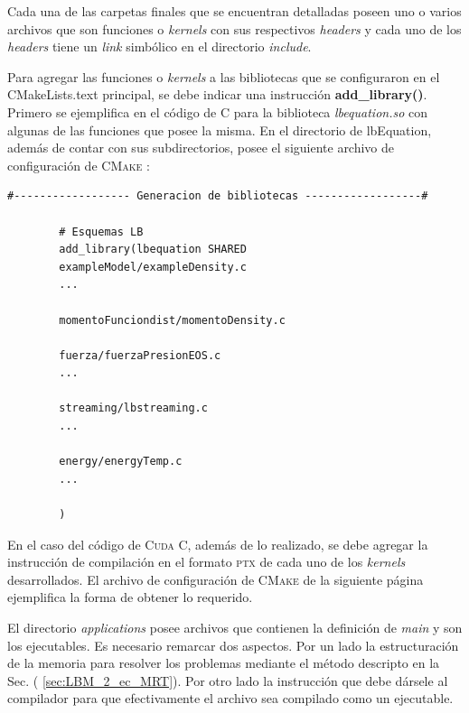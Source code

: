 \newpage

Cada una de las carpetas finales que se encuentran detalladas poseen uno o varios archivos que son funciones o \textit{kernels} con sus respectivos \textit{headers} y cada uno de los \textit{headers} tiene un \textit{link} simbólico en el directorio \textit{include}.

Para agregar las funciones o \textit{kernels} a las bibliotecas que se configuraron en el CMakeLists.text principal, se debe indicar una instrucción \textbf{add\_library()}. Primero se ejemplifica en el código de \textsc{C} para la biblioteca \textit{lbequation.so} con algunas de las funciones que posee la misma. En el directorio de lbEquation, además de contar con sus subdirectorios, posee el siguiente archivo de configuración de \textsc{CMake} :

{\footnotesize
	\begin{frame}{}
		\begin{lstlisting}[frame=single]
#------------------ Generacion de bibliotecas ------------------#
		
		# Esquemas LB
		add_library(lbequation SHARED 
		exampleModel/exampleDensity.c
		...
		
		momentoFunciondist/momentoDensity.c
		
		fuerza/fuerzaPresionEOS.c
		...
		
		streaming/lbstreaming.c
		...
		
		energy/energyTemp.c
		...
		
		)
		\end{lstlisting}
		
	\end{frame}
}

En el caso del código de \textsc{Cuda C}, además de lo realizado, se debe agregar la instrucción de compilación en el formato \textsc{ptx} de cada uno de los \textit{kernels} desarrollados. El archivo de configuración de \textsc{CMake} de la siguiente página ejemplifica la forma de obtener lo requerido.

El directorio \textit{applications} posee archivos que contienen la definición de \textit{main} y son los ejecutables. Es necesario remarcar dos aspectos. Por un lado la estructuración de la memoria para resolver los problemas mediante el método descripto en la Sec. ( \ref{sec:LBM_2_ec_MRT}). Por otro lado la instrucción que debe dársele al compilador para que efectivamente el archivo sea compilado como un ejecutable.

